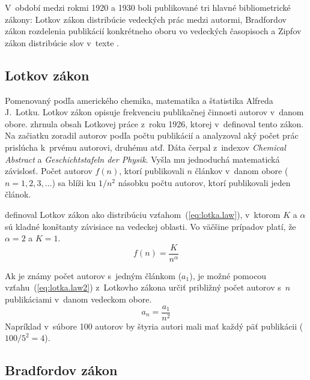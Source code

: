 V~období medzi rokmi 1920 a 1930 boli publikované tri hlavné bibliometrické
zákony: Lotkov zákon distribúcie vedeckých prác medzi autormi, Bradfordov zákon
rozdelenia publikácií konkrétneho oboru vo vedeckých časopisoch a Zipfov
zákon distribúcie
slov v~texte \citep{Bellis2009}.


\subsection{Lotkov zákon}

Pomenovaný podľa amerického chemika, matematika a štatistika Alfreda J.~Lotku.
Lotkov zákon opisuje frekvenciu publikačnej činnosti autorov v~danom obore.
\citet{Ondrisova2011} zhrnula obsah Lotkovej práce z~roku 1926, ktorej
v~definoval tento zákon.  Na začiatku zoradil autorov podľa počtu publikácií a
analyzoval aký počet prác prislúcha k~prvému autorovi, druhému atď.  Dáta čerpal
z~indexov \emph{Chemical Abstract} a \emph{Geschichtstafeln der Physik}.  Vyšla
mu jednoduchá matematická závislosť.  Počet autorov $f(n)$, ktorí publikovali
$n$ článkov v~danom obore ($n = 1, 2, 3, \dots$) sa blíži ku $1/n^2$ násobku
počtu autorov, ktorí publikovali jeden článok.

\citet{Egghe2005} definoval Lotkov zákon ako distribúciu
vzťahom~(\ref{eq:lotka.law}), v~ktorom $K$ a $\alpha$ sú kladné konštanty
závisiace na vedeckej oblasti.  Vo väčšine prípadov platí, že $\alpha = 2$ a
$K = 1$.
\begin{equation}
\label{eq:lotka.law}
f(n) = \frac{K}{n^\alpha}
\end{equation}

Ak je známy počet autorov s~jedným článkom ($a_1$), je možné pomocou
vzťahu~(\ref{eq:lotka.law2}) z~Lotkovho zákona určiť približný počet autorov
s~$n$ publikáciami v~danom vedeckom obore.
\begin{equation}
\label{eq:lotka.law2}
a_n = \frac{a_1}{n^2}
\end{equation}
Napríklad v~súbore 100 autorov by štyria autori mali mať každý päť publikácii
($100/5^2 = 4$).


\subsection{Bradfordov zákon}

